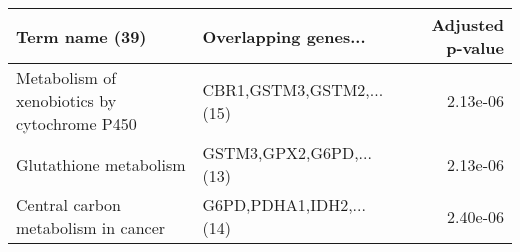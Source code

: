\begin{tabular}{llr}
\toprule
                              Term name (39) &     Overlapping genes... &  Adjusted p-value \\
\midrule
Metabolism of xenobiotics by cytochrome P450 & CBR1,GSTM3,GSTM2,...(15) &          2.13e-06 \\
                      Glutathione metabolism &  GSTM3,GPX2,G6PD,...(13) &          2.13e-06 \\
         Central carbon metabolism in cancer &  G6PD,PDHA1,IDH2,...(14) &          2.40e-06 \\
\bottomrule
\end{tabular}
